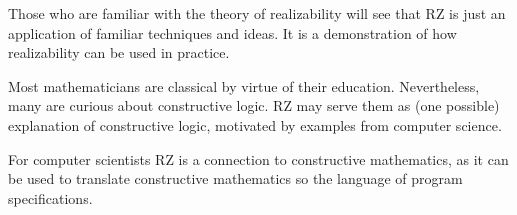 Those who are familiar with the theory of realizability will see that
RZ is just an application of familiar techniques and ideas. It is a
demonstration of how realizability can be used in practice.

Most mathematicians are classical by virtue of their education.
Nevertheless, many are curious about constructive logic. RZ may serve
them as (one possible) explanation of constructive logic, motivated by
examples from computer science.

For computer scientists RZ is a connection to constructive
mathematics, as it can be used to translate constructive mathematics
so the language of program specifications.


